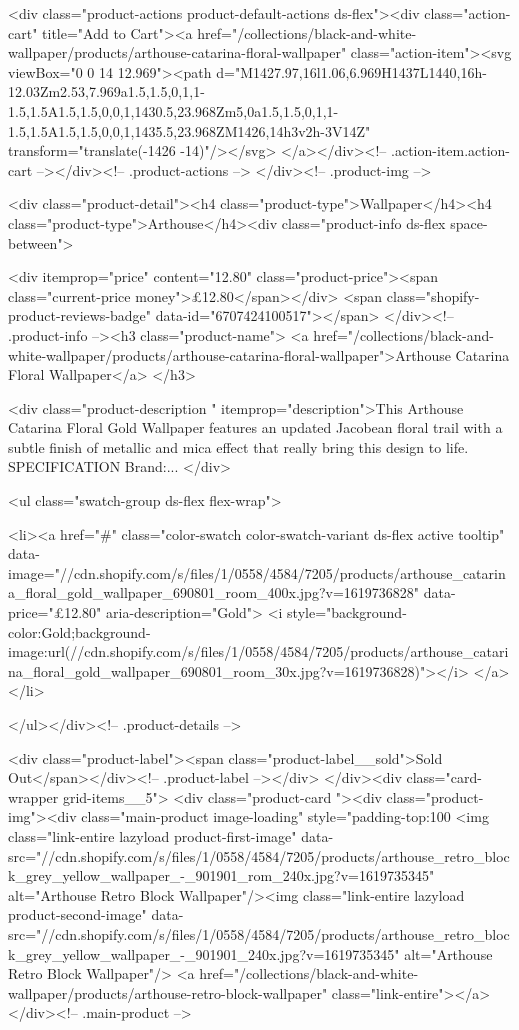 {{{{{{{<div class="product-actions product-default-actions ds-flex"><div class="action-cart" title="Add to Cart"><a href="/collections/black-and-white-wallpaper/products/arthouse-catarina-floral-wallpaper" class="action-item"><svg viewBox="0 0 14 12.969"><path d="M1427.97,16l1.06,6.969H1437L1440,16h-12.03Zm2.53,7.969a1.5,1.5,0,1,1-1.5,1.5A1.5,1.5,0,0,1,1430.5,23.968Zm5,0a1.5,1.5,0,1,1-1.5,1.5A1.5,1.5,0,0,1,1435.5,23.968ZM1426,14h3v2h-3V14Z" transform="translate(-1426 -14)"/></svg>
</a></div><!-- .action-item.action-cart --></div><!-- .product-actions -->
</div><!-- .product-img -->

<div class="product-detail"><h4 class="product-type">Wallpaper</h4><h4 class="product-type">Arthouse</h4><div class="product-info ds-flex space-between">
    
<div itemprop="price" content="12.80" class="product-price"><span class="current-price money">£12.80</span></div>
    <span class="shopify-product-reviews-badge" data-id="6707424100517"></span>
  </div><!-- .product-info --><h3 class="product-name">
      <a href="/collections/black-and-white-wallpaper/products/arthouse-catarina-floral-wallpaper">Arthouse Catarina Floral Wallpaper</a>
    </h3>
    
<div class="product-description " itemprop="description">This Arthouse Catarina Floral Gold Wallpaper features an updated Jacobean floral trail with a subtle finish of metallic and mica effect that really bring this design to life. SPECIFICATION Brand:...
</div>



<ul class="swatch-group ds-flex flex-wrap">
        
<li><a href="#" class="color-swatch color-swatch-variant ds-flex active tooltip" data-image="//cdn.shopify.com/s/files/1/0558/4584/7205/products/arthouse_catarina_floral_gold_wallpaper_690801_room_400x.jpg?v=1619736828" data-price="£12.80" aria-description="Gold">
              <i style="background-color:Gold;background-image:url(//cdn.shopify.com/s/files/1/0558/4584/7205/products/arthouse_catarina_floral_gold_wallpaper_690801_room_30x.jpg?v=1619736828)"></i>
            </a></li>

      </ul></div><!-- .product-details -->

<div class="product-label"><span class="product-label__sold">Sold Out</span></div><!-- .product-label --></div>
          </div><div class="card-wrapper grid-items__5">
            <div class="product-card "><div class="product-img"><div class="main-product image-loading" style="padding-top:100%
      <img class="link-entire lazyload product-first-image" data-src="//cdn.shopify.com/s/files/1/0558/4584/7205/products/arthouse_retro_block_grey_yellow_wallpaper_-_901901_rom_240x.jpg?v=1619735345" alt="Arthouse Retro Block Wallpaper"/><img class="link-entire lazyload product-second-image" data-src="//cdn.shopify.com/s/files/1/0558/4584/7205/products/arthouse_retro_block_grey_yellow_wallpaper_-_901901_240x.jpg?v=1619735345" alt="Arthouse Retro Block Wallpaper"/>
      <a href="/collections/black-and-white-wallpaper/products/arthouse-retro-block-wallpaper" class="link-entire"></a>
    </div><!-- .main-product -->
  
}}}}}}}

